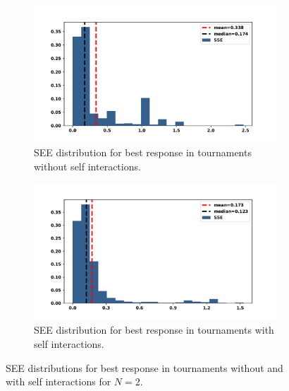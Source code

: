 \begin{figure}[!htbp]
    \begin{subfigure}{0.5\textwidth}
        \begin{center}
            \includegraphics[width=\linewidth]{src/chapters/05/paper/memory-size-in-the-prisoners-dilemma/img/best_respones_sserror.pdf}
        \end{center}
        \caption{SEE distribution for best response in tournaments without self interactions.}
    \end{subfigure}\hfill
    \begin{subfigure}{0.5\textwidth}
        \begin{center}
            \includegraphics[width=\linewidth]{src/chapters/05/paper/memory-size-in-the-prisoners-dilemma/img/evo_sserror.pdf}
        \end{center}
        \caption{SEE distribution for best response in tournaments with self interactions.}
    \end{subfigure}
    \caption{SEE distributions for best response in tournaments without and with self interactions for \(N=2\).}\label{fig:sse_distributions}
\end{figure}

